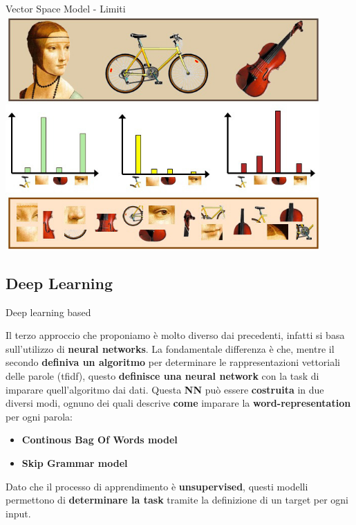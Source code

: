 \documentclass[british]{beamer}
\begin{document}
\begin{frame}{Vector Space Model - Limiti}
	\includegraphics[width=0.9\textwidth, height=0.8\textheight]{./Imgs/bow-example.jpeg}
\end{frame}

\subsection{Deep Learning}

\begin{frame}{Deep learning based}
	
	Il terzo approccio che proponiamo \`{e} molto diverso dai precedenti, infatti si basa sull'utilizzo di \textbf{neural networks}.
	La fondamentale differenza \`{e} che, mentre il secondo \textbf{definiva un algoritmo} per determinare le rappresentazioni vettoriali delle parole (tfidf), questo \textbf{definisce una neural network} con la task di imparare quell'algoritmo dai dati.
	Questa \textbf{NN} pu\`{o} essere \textbf{costruita} in due diversi modi, ognuno dei quali descrive \textbf{come} imparare la \textbf{word-representation} per ogni parola:
	\begin{itemize}
		\item \textbf{Continous Bag Of Words model}
		\item \textbf{Skip Grammar model}
	\end{itemize}
	Dato che il processo di apprendimento \`{e} \textbf{unsupervised}, questi modelli permettono di \textbf{determinare la task} tramite la definizione di un target per ogni input.
\end{frame}
	
\end{document}
